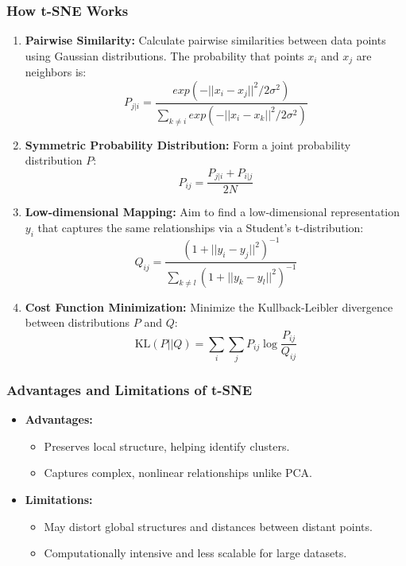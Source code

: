 \documentclass[aspectratio=169]{beamer}
\begin{document}
\begin{frame}[fragile]
    \frametitle{How t-SNE Works}
    \begin{enumerate}
        \item \textbf{Pairwise Similarity:} Calculate pairwise similarities between data points using Gaussian distributions. The probability that points \(x_i\) and \(x_j\) are neighbors is:
        \[
        P_{j|i} = \frac{exp(-||x_i - x_j||^2/2\sigma^2)}{\sum_{k \neq i} exp(-||x_i - x_k||^2/2\sigma^2)}
        \]
        
        \item \textbf{Symmetric Probability Distribution:} Form a joint probability distribution \(P\):
        \[
        P_{ij} = \frac{P_{j|i} + P_{i|j}}{2N}
        \]
        
        \item \textbf{Low-dimensional Mapping:} Aim to find a low-dimensional representation \(y_i\) that captures the same relationships via a Student's t-distribution:
        \[
        Q_{ij} = \frac{(1 + ||y_i - y_j||^2)^{-1}}{\sum_{k \neq l} (1 + ||y_k - y_l||^2)^{-1}}
        \]
        
        \item \textbf{Cost Function Minimization:} Minimize the Kullback-Leibler divergence between distributions \(P\) and \(Q\):
        \[
        \text{KL}(P || Q) = \sum_{i} \sum_{j} P_{ij} \log \frac{P_{ij}}{Q_{ij}}
        \]
    \end{enumerate}
\end{frame}

\begin{frame}[fragile]
    \frametitle{Advantages and Limitations of t-SNE}
    \begin{itemize}
        \item \textbf{Advantages:}
        \begin{itemize}
            \item Preserves local structure, helping identify clusters.
            \item Captures complex, nonlinear relationships unlike PCA.
        \end{itemize}
        
        \item \textbf{Limitations:}
        \begin{itemize}
            \item May distort global structures and distances between distant points.
            \item Computationally intensive and less scalable for large datasets.
        \end{itemize}
    \end{itemize}
\end{frame}
\end{document}
